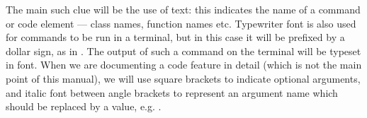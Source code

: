 The main such clue will be the use of  text: this
indicates the name of a command or code element --- class names, function names
etc. Typewriter font is also used for commands to be run in a terminal, but in
this case it will be prefixed by a dollar sign, as in .  The output of such a command on the terminal will be typeset in
 font. When we are documenting a code feature in detail (which
is not the main point of this manual), we will use square brackets to indicate
optional arguments, and italic font between angle brackets to represent an
argument name which should be replaced by a value,
e.g. .

